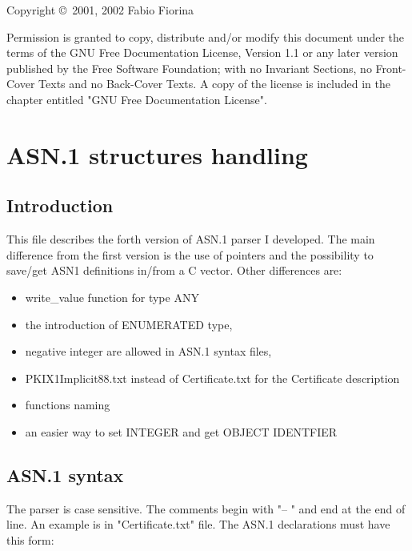 \documentclass{book}
\begin{document}

\begin{center}
\par
Copyright \copyright\ 2001, 2002 Fabio Fiorina\\
\setlength{\parskip}{4mm}
\par
Permission is granted to copy, distribute and/or modify this
document under the terms of the GNU Free Documentation License,
Version 1.1 or any later version published by the Free Software
Foundation; with no Invariant Sections, no Front-Cover Texts and
no Back-Cover Texts.  A copy of the license is included in the
chapter entitled "GNU Free Documentation License".
\end{center}

\setlength{\parindent}{2mm}

\setlength{\parskip}{1mm}


\chapter{ASN.1 structures handling}

\section{Introduction}
 This file describes the forth version of ASN.1 parser I
developed.
The main difference from the first version is the use of pointers and the
possibility to save/get ASN1 definitions in/from a C vector.
Other differences are:
\begin{itemize}
\item write\_value function for type ANY
\item the introduction of ENUMERATED type,
\item negative integer are allowed in ASN.1 syntax files,
\item PKIX1Implicit88.txt instead of Certificate.txt for the Certificate description
\item functions naming 
\item an easier way to set INTEGER and get OBJECT IDENTFIER  
\end{itemize}


\section{ASN.1 syntax}
The parser is case sensitive. The comments begin with "-- " and end at the end of line.
An example is in "Certificate.txt" file.
The ASN.1 declarations must have this form:
      
\end{document}
